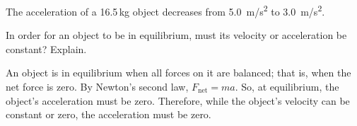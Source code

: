 \documentclass[answers]{exam}
\begin{document}
\begin{questions}
\question
The acceleration of a 16.5\,kg object decreases from \SI{5.0}{m/s^2} to \SI{3.0}{m/s^2}.


\question
In order for an object to be in equilibrium, must its velocity or acceleration be constant? Explain.

\begin{solution}
An object is in equilibrium when all forces on it are balanced; that is, when the net force is zero. By Newton's second law, $F_\mathrm{net} = ma$. So, at equilibrium, the object's acceleration must be zero. Therefore, while the object's velocity can be constant or zero, the acceleration must be zero.
\end{solution}


\end{questions}
\end{document}
